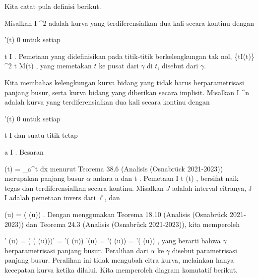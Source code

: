 Kita catat pula definisi berikut.

{}
{

Misalkan
\maabb {\gamma} { I } { \R^2
} {}
adalah kurva yang terdiferensialkan dua kali secara kontinu dengan

\mavergleichskette
{\vergleichskette
{ \gamma'(t)
}
{ \neq }{ 0
}
{  }{
}
{    }{
}
{   }{
}
}
{}{}{}
untuk setiap

\mavergleichskette
{\vergleichskette
{ t
}
{ \in }{ I
}
{  }{
}
{    }{
}
{   }{
}
}
{}{}{.}
Pemetaan yang didefinisikan pada titik-titik berkelengkungan tak nol,
\maabbeledisp {} { \{t\in I\mid \kappa(t)\} } { \R^2
} { t } { M(t)
} {,}
yang memetakan $t$ ke pusat
dari $\gamma$ di $t$, disebut
dari $\gamma$.

}


Kita membahas kelengkungan kurva bidang yang tidak harus berparametrisasi panjang busur, serta kurva bidang yang diberikan secara implisit. Misalkan
\maabbdisp {\alpha} {I} { \R^n
} {}
adalah kurva yang terdiferensialkan dua kali secara kontinu dengan

\mavergleichskette
{\vergleichskette
{ \alpha'(t)
}
{ \neq }{ 0
}
{  }{
}
{    }{
}
{   }{
}
}
{}{}{}
untuk setiap

\mavergleichskette
{\vergleichskette
{ t
}
{ \in }{ I
}
{  }{
}
{    }{
}
{   }{
}
}
{}{}{}
dan suatu titik tetap

\mavergleichskette
{\vergleichskette
{ a
}
{ \in }{ I
}
{  }{
}
{    }{
}
{   }{
}
}
{}{}{.}
Besaran

\mavergleichskettedisp
{\vergleichskette
{ \ell(t)
}
{ =} { \int_a^t  \Vert dx
}
{ } {
}
{ } {
}
{ } {
}
}
{}{}{}
menurut
Teorema 38.6 (Analisis (Osnabrück 2021-2023))
merupakan panjang busur $\alpha$ antara
\mathkor {} {a} {dan} {t} {.}
Pemetaan
\maabbeledisp {\ell} {I} { \R
} {t} { \ell(t)
} {,}
bersifat naik tegas dan terdiferensialkan secara kontinu. Misalkan $J$ adalah interval citranya,
\maabb {\beta} {J} {I
} {}
adalah pemetaan invers dari $\ell$, dan

\mavergleichskette
{\vergleichskette
{  \gamma (u)
}
{ = }{  \alpha( \beta(u))
}
{  }{
}
{    }{
}
{   }{
}
}
{}{}{.}
Dengan menggunakan
Teorema 18.10 (Analisis (Osnabrück 2021-2023))
dan
Teorema 24.3 (Analisis (Osnabrück 2021-2023)),
kita memperoleh

\mavergleichskettealign
{\vergleichskettealign
{ \gamma' (u)
}
{ =} { ( \alpha( \beta(u)))'
}
{ =} { \alpha'( \beta(u)) \beta'(u)
}
{ =} { \alpha'( \beta(u)) {  }
}
{ =} { \alpha'( \beta(u)) {  }
}
}
{}
{}{,}
yang berarti bahwa $\gamma$ berparametrisasi panjang busur. Peralihan dari $\alpha$ ke $\gamma$ disebut parametrisasi panjang busur. Peralihan ini tidak mengubah citra kurva, melainkan hanya kecepatan kurva ketika dilalui. Kita memperoleh diagram komutatif berikut.

